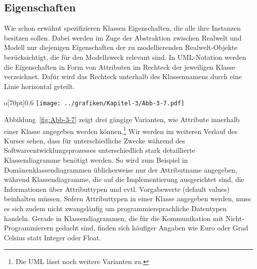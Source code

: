 \subsection{Eigenschaften}

Wie schon erwähnt spezifizieren Klassen Eigenschaften, die alle ihre Instanzen besitzen sollen. Dabei werden im Zuge der Abstraktion zwischen Realwelt und Modell nur diejenigen Eigenschaften der zu modellierenden Realwelt-Objekte berücksichtigt, die für den Modellzweck relevant sind. In UML-Notation werden die Eigenschaften in Form von Attributen im Rechteck der jeweiligen Klasse verzeichnet. Dafür wird das Rechteck unterhalb des Klassennamens durch eine Linie horizontal geteilt.
\begin{wrapfigure}{o}[70pt]{0.6\textwidth}
	\centering 
	\texttt{[image: ../grafiken/Kapitel-3/Abb-3-7.pdf]}
	\caption{Eine Klasse mit Attributen in UML-Darstellung}
	\label{fig:Abb-3-7}
	\vspace{-6pt}
\end{wrapfigure}
Abbildung~\ref{fig:Abb-3-7} zeigt drei gängige Varianten, wie Attribute innerhalb einer Klasse angegeben werden können.\footnote{Die UML lässt noch weitere Varianten zu.} Wir werden im weiteren Verlauf des Kurses sehen, dass für unterschiedliche Zwecke während des Softwareentwicklungsprozesses unterschiedlich stark detaillierte Klassendiagramme benötigt werden. So wird zum Beispiel in Domänenklassendiagrammen üblicherweise nur der Attributname angegeben, während Klassendiagramme, die auf die Implementierung ausgerichtet sind, die Informationen über Attributtypen und evtl. Vorgabewerte (default values) beinhalten müssen. Sofern Attributtypen in einer Klasse angegeben werden, muss es sich zudem nicht zwangsläufig um programmiersprachliche Datentypen handeln. Gerade in Klassendiagrammen, die für die Kommunikation mit Nicht-Programmierern gedacht sind, finden sich häufiger Angaben wie Euro oder Grad Celsius statt Integer oder Float.

